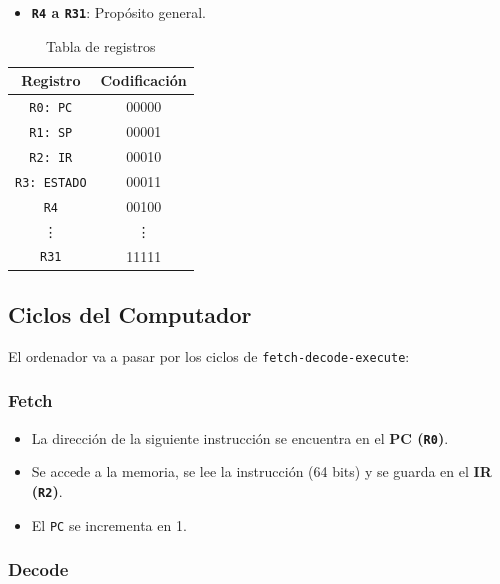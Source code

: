 \documentclass{article}
\begin{document}
\begin{itemize}
  \item \textbf{\texttt{R4} a \texttt{R31}}: Propósito general.
\end{itemize}

\begin{table}[H]
  \centering
  \begin{tabular}{|c|c|}
    \hline
    \textbf{Registro}   & \textbf{Codificación} \\
    \hline
    \texttt{R0: PC}     & 00000                 \\
    \texttt{R1: SP}     & 00001                 \\
    \texttt{R2: IR}     & 00010                 \\
    \texttt{R3: ESTADO} & 00011                 \\
    \texttt{R4}         & 00100                 \\
    \vdots              & \vdots                \\
    \texttt{R31}        & 11111                 \\
    \hline
  \end{tabular}
  \caption{Tabla de registros}
\end{table}

\subsection{Ciclos del Computador}

El ordenador va a pasar por los ciclos de \texttt{fetch-decode-execute}:

\subsubsection{Fetch}

\begin{itemize}
  \item La dirección de la siguiente instrucción se encuentra en el \textbf{PC (\texttt{R0})}.
  \item Se accede a la memoria, se lee la instrucción (64 bits) y se guarda en el \textbf{IR (\texttt{R2})}.
  \item El \texttt{PC} se incrementa en 1.
\end{itemize}

\subsubsection{Decode}
\end{document}
